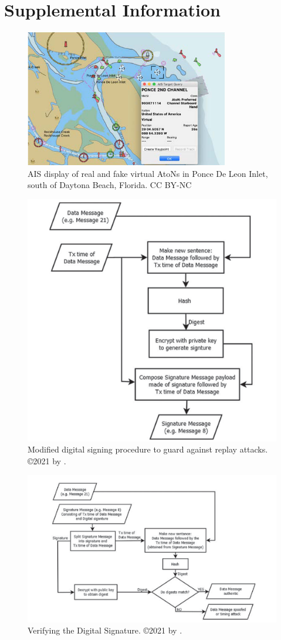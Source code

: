 \documentclass[12pt]{texMemo} %
\begin{document}
\section*{Supplemental Information}
\begin{figure}[hb]
    \centering
    \includegraphics[width=0.5\linewidth]{bad-aton.png}
    \caption{AIS display of real and fake virtual AtoNs in Ponce De Leon Inlet, south of Daytona Beach, Florida.  CC BY-NC}
    \label{fig:Bad AToN}
\end{figure}
\begin{figure}[hb]
    \centering
    \includegraphics[width=.75\linewidth]{replay.png}
    \caption{Modified digital signing procedure to guard against replay attacks.  \copyright 2021 by \citeauthor{wimpenny_securing_2022}.}
    \label{fig:replay}
\end{figure}
\begin{figure}[hb]
    \centering
    \includegraphics[width=0.75\linewidth]{verifiction.png}
    \caption{Verifying the Digital Signature.  \copyright 2021 by \citeauthor{wimpenny_securing_2022}.}
    \label{fig:verify}
\end{figure}
\end{document}
